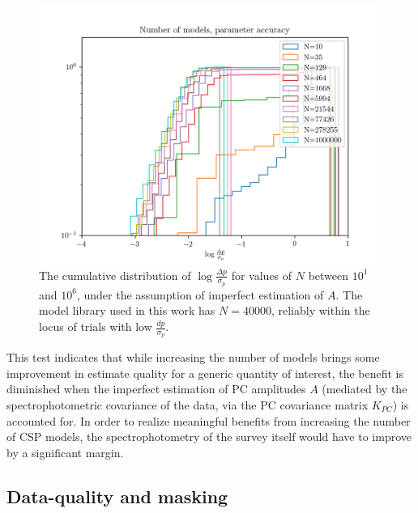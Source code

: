 \begin{figure}
    \centering
    \includegraphics{nmodels_paramerr_imperfectA}
    \caption[Parameter reliability assuming imperfect PC down-projection]{The cumulative distribution of $\log \frac{\Delta p}{\sigma_p}$ for values of $N$ between $10^1$ and $10^6$, under the assumption of imperfect estimation of $A$. The model library used in this work has $N = 40000$, reliably within the locus of trials with low $\frac{dp}{\sigma_p}$.}
    \label{fig:nmodels_paramerr_imperfectA}
\end{figure}

This test indicates that while increasing the number of models brings some improvement in estimate quality for a generic quantity of interest, the benefit is diminished when the imperfect estimation of PC amplitudes $A$ (mediated by the spectrophotometric covariance of the data, via the PC covariance matrix $K_{PC}$) is accounted for. In order to realize meaningful benefits from increasing the number of CSP models, the spectrophotometry of the survey itself would have to improve by a significant margin.

\subsection{Data-quality and masking}
\label{chap1:subsec:data_quality}

